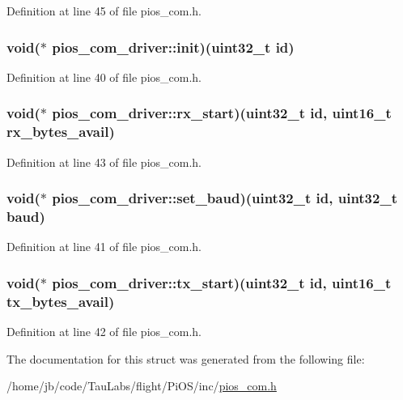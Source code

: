 \-Definition at line 45 of file pios\-\_\-com.\-h.

\hypertarget{structpios__com__driver_a99b7480f64d07211d74f522059e33672}{
\subsubsection[{init}]{\setlength{\rightskip}{0pt plus 5cm}void($\ast$ {\bf pios\-\_\-com\-\_\-driver\-::init})(uint32\-\_\-t {\bf id})}}\label{structpios__com__driver_a99b7480f64d07211d74f522059e33672}


\-Definition at line 40 of file pios\-\_\-com.\-h.

\hypertarget{structpios__com__driver_a0c6384ecc39e1e638dddb2570602f7ff}{
\subsubsection[{rx\-\_\-start}]{\setlength{\rightskip}{0pt plus 5cm}void($\ast$ {\bf pios\-\_\-com\-\_\-driver\-::rx\-\_\-start})(uint32\-\_\-t {\bf id}, uint16\-\_\-t rx\-\_\-bytes\-\_\-avail)}}\label{structpios__com__driver_a0c6384ecc39e1e638dddb2570602f7ff}


\-Definition at line 43 of file pios\-\_\-com.\-h.

\hypertarget{structpios__com__driver_a904e9142a63c6aa2ada8e7b66855ff4a}{
\subsubsection[{set\-\_\-baud}]{\setlength{\rightskip}{0pt plus 5cm}void($\ast$ {\bf pios\-\_\-com\-\_\-driver\-::set\-\_\-baud})(uint32\-\_\-t {\bf id}, uint32\-\_\-t baud)}}\label{structpios__com__driver_a904e9142a63c6aa2ada8e7b66855ff4a}


\-Definition at line 41 of file pios\-\_\-com.\-h.

\hypertarget{structpios__com__driver_a54751423be66aa5eeef4655f56ae656d}{
\subsubsection[{tx\-\_\-start}]{\setlength{\rightskip}{0pt plus 5cm}void($\ast$ {\bf pios\-\_\-com\-\_\-driver\-::tx\-\_\-start})(uint32\-\_\-t {\bf id}, uint16\-\_\-t tx\-\_\-bytes\-\_\-avail)}}\label{structpios__com__driver_a54751423be66aa5eeef4655f56ae656d}


\-Definition at line 42 of file pios\-\_\-com.\-h.



\-The documentation for this struct was generated from the following file\-:\begin{DoxyCompactItemize}
\item 
/home/jb/code/\-Tau\-Labs/flight/\-Pi\-O\-S/inc/\hyperlink{pios__com_8h}{pios\-\_\-com.\-h}\end{DoxyCompactItemize}
